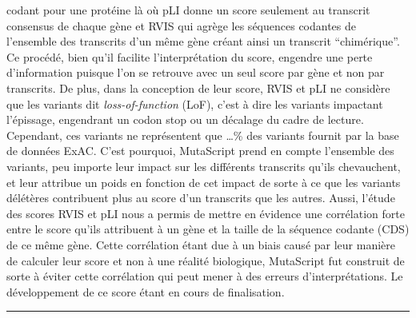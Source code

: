 \documentclass[12pt,twoside]{reedthesis}
\begin{document}
  codant pour une protéine là où pLI donne un score seulement au transcrit
  consensus de chaque gène et RVIS qui agrège les séquences codantes de
  l'ensemble des transcrits d'un même gène créant ainsi un transcrit
  ``chimérique''. Ce procédé, bien qu'il facilite l'interprétation du
  score, engendre une perte d'information puisque l'on se retrouve avec un
  seul score par gène et non par transcrits. De plus, dans la conception
  de leur score, RVIS et pLI ne considère que les variants dit
  \emph{loss-of-function} (LoF), c'est à dire les variants impactant
  l'épissage, engendrant un codon stop ou un décalage du cadre de lecture.
  Cependant, ces variants ne représentent que \ldots{}\% des variants
  fournit par la base de données ExAC. C'est pourquoi, MutaScript prend en
  compte l'ensemble des variants, peu importe leur impact sur les
  différents transcrits qu'ils chevauchent, et leur attribue un poids en
  fonction de cet impact de sorte à ce que les variants délétères
  contribuent plus au score d'un transcrits que les autres. Aussi, l'étude
  des scores RVIS et pLI nous a permis de mettre en évidence une
  corrélation forte entre le score qu'ils attribuent à un gène et la
  taille de la séquence codante (CDS) de ce même gène. Cette corrélation
  étant due à un biais causé par leur manière de calculer leur score et
  non à une réalité biologique, MutaScript fut construit de sorte à éviter
  cette corrélation qui peut mener à des erreurs d'interprétations. Le
  développement de ce score étant en cours de finalisation.
  
  \begin{center}\rule{0.5\linewidth}{\linethickness}\end{center}
  
\end{document}
